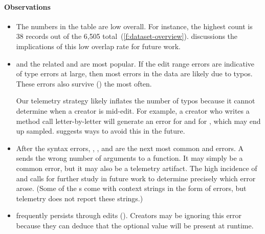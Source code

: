 \documentclass[english,submission,cleveref]{programming}
\begin{document}
\paragraph{Observations}

\begin{itemize}
  \item
    The numbers in the table are low overall.
    For instance, the highest \mstrict{} count is 38
    records out of the 6,505 total~(\cref{f:dataset-overview}).
     discussions the implications
    of this low overlap rate for future work.

  \item
     and the related  and
     are most popular.
    If the edit range errors are indicative of type errors at large,
    then most errors in the data are likely due to typos.
    These errors also survive (\keepsym{}) the most often.

    Our telemetry strategy likely inflates
    the number of typos because it cannot determine when a creator is
    mid-edit.
    For example, a creator who writes a method call
     letter-by-letter will generate an
     error for  and
     for , which may end up sampled.
     suggests ways
    to avoid this in the future.

  \item
    After the syntax errors, , , and
     are the next most common \mnonstrict{} and \mstrict{}
    errors.
    A  sends the wrong number of arguments to a function.
    It may simply be a common error, but it may also be a
    telemetry artifact.
    The high incidence of  and  calls for
    further study in future work to determine precisely which error arose.
    (Some of the s come with context strings in the form of
     errors, but telemetry does not report these strings.)

  \item
     frequently persists through edits (\keepsym{}).
    Creators may be ignoring this error because they can deduce that the
    optional value will be present at runtime.


\end{itemize}
\end{document}
